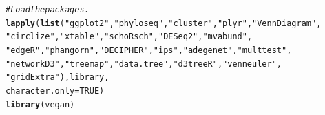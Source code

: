 \documentclass[12pt]{article}\usepackage[]{graphicx}\usepackage[]{color}
\makeatletter
\newcommand{\hlnum}[1]{\textcolor[rgb]{0.686,0.059,0.569}{#1}}%
\newcommand{\hlstr}[1]{\textcolor[rgb]{0.192,0.494,0.8}{#1}}%
\newcommand{\hlcom}[1]{\textcolor[rgb]{0.678,0.584,0.686}{\textit{#1}}}%
\newcommand{\hlstd}[1]{\textcolor[rgb]{0.345,0.345,0.345}{#1}}%
\newcommand{\hlkwc}[1]{\textcolor[rgb]{0.333,0.667,0.333}{#1}}%
\newcommand{\hlkwd}[1]{\textcolor[rgb]{0.737,0.353,0.396}{\textbf{#1}}}%
\newenvironment{kframe}{%
 \def\at@end@of@kframe{}%
 \ifinner\ifhmode%
  \def\at@end@of@kframe{\end{minipage}}%
  \begin{minipage}{\columnwidth}%
 \fi\fi%
 \def\FrameCommand##1{\hskip\@totalleftmargin \hskip-\fboxsep
 \colorbox{shadecolor}{##1}\hskip-\fboxsep
     \hskip-\linewidth \hskip-\@totalleftmargin \hskip\columnwidth}%
 \MakeFramed {\advance\hsize-\width
   \@totalleftmargin\z@ \linewidth\hsize
   \@setminipage}}%
 {\par\unskip\endMakeFramed%
 \at@end@of@kframe}
\newenvironment{knitrout}{}{} %
\numberwithin{figure}{section}
\makeatother
\begin{document}
\begin{knitrout}\small
{}\color{fgcolor}\begin{kframe}
\begin{alltt}
\hlcom{#Load the packages. }
\hlkwd{lapply}\hlstd{(}\hlkwd{list}\hlstd{(}\hlstr{"ggplot2"}\hlstd{,} \hlstr{"phyloseq"}\hlstd{,} \hlstr{"cluster"}\hlstd{,} \hlstr{"plyr"}\hlstd{,} \hlstr{"VennDiagram"}\hlstd{,}
            \hlstr{"circlize"}\hlstd{,} \hlstr{"xtable"}\hlstd{,} \hlstr{"schoRsch"}\hlstd{,} \hlstr{"DESeq2"}\hlstd{,} \hlstr{"mvabund"}\hlstd{,}
            \hlstr{"edgeR"}\hlstd{,} \hlstr{"phangorn"}\hlstd{,} \hlstr{"DECIPHER"}\hlstd{,} \hlstr{"ips"}\hlstd{,} \hlstr{"adegenet"}\hlstd{,} \hlstr{"multtest"}\hlstd{,}
            \hlstr{"networkD3"}\hlstd{,} \hlstr{"treemap"}\hlstd{,} \hlstr{"data.tree"}\hlstd{,} \hlstr{"d3treeR"}\hlstd{,} \hlstr{"venneuler"}\hlstd{,}
            \hlstr{"gridExtra"}\hlstd{), library,}
       \hlkwc{character.only} \hlstd{=} \hlnum{TRUE}\hlstd{)}
\hlkwd{library}\hlstd{(vegan)}
\end{alltt}
\end{kframe}
\end{knitrout}
\end{document}
